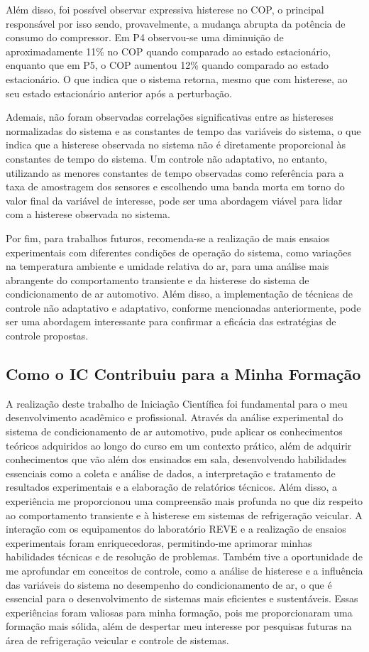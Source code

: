 Além disso, foi possível observar expressiva histerese no COP, o principal responsável por isso sendo, provavelmente, a mudança abrupta da potência de consumo do compressor. Em P4  observou-se uma diminuição de aproximadamente 11\% no COP quando comparado ao estado estacionário, enquanto que em P5, o COP aumentou 12\% quando comparado ao estado estacionário.  O que indica que o sistema retorna, mesmo que com histerese, ao seu estado estacionário anterior após a perturbação.

Ademais, não foram observadas correlações significativas entre as histereses normalizadas do sistema e as constantes de tempo das variáveis do sistema, o que indica que a histerese observada no sistema não é diretamente proporcional às constantes de tempo do sistema. Um controle não adaptativo, no entanto, utilizando as menores constantes de tempo observadas como referência para a taxa de amostragem dos sensores e escolhendo uma banda morta em torno do valor final da variável de interesse, pode ser uma abordagem viável para lidar com a histerese observada no sistema.

Por fim, para trabalhos futuros, recomenda-se a realização de mais ensaios experimentais com diferentes condições de operação do sistema, como variações na temperatura ambiente e umidade relativa do ar, para uma análise mais abrangente do comportamento transiente e da histerese do sistema de condicionamento de ar automotivo. Além disso, a implementação de técnicas de controle não adaptativo e adaptativo, conforme mencionadas anteriormente, pode ser uma abordagem interessante para confirmar a eficácia das estratégias de controle propostas.

\subsection{Como o IC Contribuiu para a Minha Formação}

A realização deste trabalho de Iniciação Científica foi fundamental para o meu desenvolvimento acadêmico e profissional. Através da análise experimental do sistema de condicionamento de ar automotivo, pude aplicar os conhecimentos teóricos adquiridos ao longo do curso em um contexto prático, além de adquirir conhecimentos que vão além dos ensinados em sala, desenvolvendo habilidades essenciais como a coleta e análise de dados, a interpretação e tratamento de resultados experimentais e a elaboração de relatórios técnicos.  Além disso, a experiência me proporcionou uma compreensão mais profunda no que diz respeito ao comportamento transiente e à histerese em sistemas de refrigeração veicular. A interação com os equipamentos do laboratório REVE e a realização de ensaios experimentais foram enriquecedoras, permitindo-me aprimorar minhas habilidades técnicas e de resolução de problemas. Também tive a oportunidade de me aprofundar em conceitos de controle, como a análise de histerese e a influência das variáveis do sistema no desempenho do condicionamento de ar, o que é essencial para o desenvolvimento de sistemas mais eficientes e sustentáveis.
Essas experiências foram valiosas para minha formação, pois me proporcionaram uma formação mais sólida, além de despertar meu interesse por pesquisas futuras na área de refrigeração veicular e controle de sistemas. 
